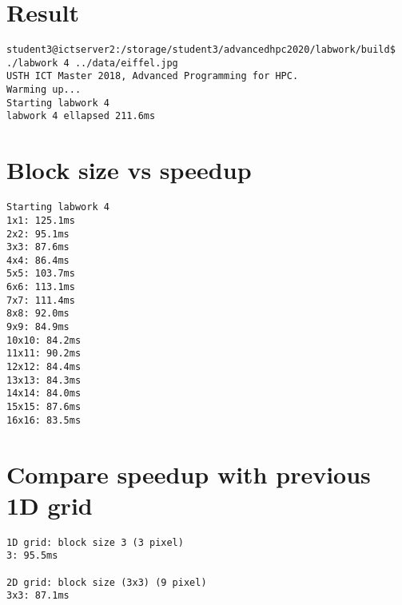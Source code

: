\documentclass{article}
\begin{document}
\section{Result}
\begin{verbatim}
student3@ictserver2:/storage/student3/advancedhpc2020/labwork/build$ ./labwork 4 ../data/eiffel.jpg
USTH ICT Master 2018, Advanced Programming for HPC.
Warming up...
Starting labwork 4
labwork 4 ellapsed 211.6ms
\end{verbatim}
\section{Block size vs speedup}
\begin{verbatim}
Starting labwork 4
1x1: 125.1ms
2x2: 95.1ms
3x3: 87.6ms
4x4: 86.4ms
5x5: 103.7ms
6x6: 113.1ms
7x7: 111.4ms
8x8: 92.0ms
9x9: 84.9ms
10x10: 84.2ms
11x11: 90.2ms
12x12: 84.4ms
13x13: 84.3ms
14x14: 84.0ms
15x15: 87.6ms
16x16: 83.5ms
\end{verbatim}

\section{Compare speedup with previous 1D grid}
\begin{verbatim}
1D grid: block size 3 (3 pixel)
3: 95.5ms

2D grid: block size (3x3) (9 pixel)
3x3: 87.1ms
\end{verbatim}
\end{document}
